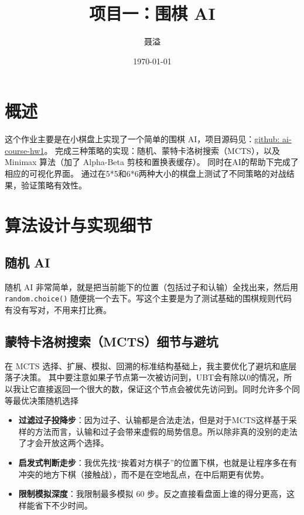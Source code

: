 \documentclass[12pt,a4paper,UTF8]{ctexart}
\title{项目一：围棋 AI}
\author{聂溢 \quad 2023010998}
\date{\today}
\begin{document}
\maketitle

\section{概述}
这个作业主要是在小棋盘上实现了一个简单的围棋 AI，项目源码见：\href{https://github.com/NewYork424/ai-course-hw1.git}{github: ai-course-hw1}。
完成三种策略的实现：随机、蒙特卡洛树搜索（MCTS），以及 Minimax 算法（加了 Alpha-Beta 剪枝和置换表缓存）。
同时在AI的帮助下完成了相应的可视化界面。
通过在5*5和6*6两种大小的棋盘上测试了不同策略的对战结果，验证策略有效性。

\section{算法设计与实现细节}

\subsection{随机 AI}
随机 AI 非常简单，就是把当前能下的位置（包括过子和认输）全找出来，然后用 \texttt{random.choice()} 随便挑一个去下。写这个主要是为了测试基础的围棋规则代码有没有写对，不用来打比赛。

\subsection{蒙特卡洛树搜索（MCTS）细节与避坑}
在 MCTS 选择、扩展、模拟、回溯的标准结构基础上，我主要优化了避坑和底层落子决策。
其中要注意如果子节点第一次被访问到，UBT会有除以0的情况，所以我让它直接返回一个很大的数，保证这个节点会被优先访问到。同时允许多个同等最优决策随机选择
\begin{itemize}
    \item \textbf{过滤过子投降步}：因为过子、认输都是合法走法，但是对于MCTS这样基于采样的方法而言，认输和过子会带来虚假的局势信息。所以除非真的没别的走法了才会开放这两个选择。
    \item \textbf{启发式判断走步}：我优先找“挨着对方棋子”的位置下棋，也就是让程序多在有冲突的地方下棋（接触战），而不是在空地乱点，在中后期更有优势。
    \item \textbf{限制模拟深度}：我限制最多模拟 60 步。反之直接看盘面上谁的得分更高，这样能省下不少时间。
\end{itemize}
\end{document}
